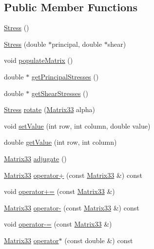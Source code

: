 \subsection*{Public Member Functions}
\begin{DoxyCompactItemize}
\item 
\hyperlink{classStress_aa01e83a3f6791cbadc5a368e3a40515e}{Stress} ()
\item 
\hyperlink{classStress_ae4e2f6250e3bdd4d3d78a9c6bdde7bab}{Stress} (double $\ast$principal, double $\ast$shear)
\item 
void \hyperlink{classStress_aa395d5763df8feb4689e0c5524c9e562}{populate\-Matrix} ()
\item 
double $\ast$ \hyperlink{classStress_aca57d2719f43701dd2ebf2ab00afa539}{get\-Principal\-Stresses} ()
\item 
double $\ast$ \hyperlink{classStress_afe8214b8e9061930e6598e1970fd61f5}{get\-Shear\-Stresses} ()
\item 
\hyperlink{classStress}{Stress} \hyperlink{classStress_a61fa75450c0232bb0fa427072d1b6a35}{rotate} (\hyperlink{classMatrix33}{Matrix33} alpha)
\item 
void \hyperlink{classMatrix33_a6cdcec77fd089b2e73ad7ae85ecff30b}{set\-Value} (int row, int column, double value)
\item 
double \hyperlink{classMatrix33_a849bbdf7b456ddacf7185b087fca4015}{get\-Value} (int row, int column)
\item 
\hyperlink{classMatrix33}{Matrix33} \hyperlink{classMatrix33_a4e64ab5af4921c24b8270a0c9050f4ba}{adjugate} ()
\item 
\hyperlink{classMatrix33}{Matrix33} \hyperlink{classMatrix33_adc58ec5739c9250ff1150c725d0e868e}{operator+} (const \hyperlink{classMatrix33}{Matrix33} \&) const 
\item 
void \hyperlink{classMatrix33_acb59e59d3937e075521f478ba83b7165}{operator+=} (const \hyperlink{classMatrix33}{Matrix33} \&)
\item 
\hyperlink{classMatrix33}{Matrix33} \hyperlink{classMatrix33_a372f71ec208bb6d3045acd4324b7cb06}{operator-\/} (const \hyperlink{classMatrix33}{Matrix33} \&) const 
\item 
void \hyperlink{classMatrix33_abc889e10a9c7c532195c7031c1344a74}{operator-\/=} (const \hyperlink{classMatrix33}{Matrix33} \&)
\item 
\hyperlink{classMatrix33}{Matrix33} \hyperlink{classMatrix33_a6992fd2bb0b6e9ad71b5d3481c4e3e1a}{operator$\ast$} (const double \&) const 
\item 

\end{DoxyCompactItemize}
